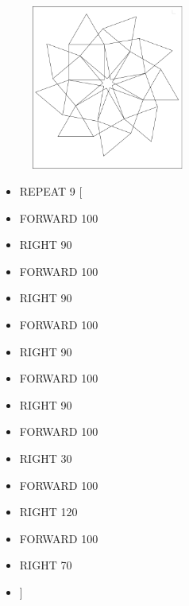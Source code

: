 \begin{minipage}{0.5\textwidth}
\begin{figure}[H]
   \includegraphics[width=5.0cm,trim=4 4 6 4,clip]{./images/marta/mar-14.png}
   \label{mar-16}
\end{figure}
\end{minipage} \hfill
\begin{minipage}{0.45\textwidth}
\begin{itemize}[itemsep=-3pt,parsep=2pt]
\item[] \hspace{0.5cm} REPEAT 9 [
\item[] \hspace{0.5cm} 	FORWARD 100
\item[] \hspace{0.5cm} 	RIGHT 90
\item[] \hspace{0.5cm} 	FORWARD 100
\item[] \hspace{0.5cm} 	RIGHT 90
\item[] \hspace{0.5cm} 	FORWARD 100
\item[] \hspace{0.5cm} 	RIGHT 90
\item[] \hspace{0.5cm} 	FORWARD 100
\item[] \hspace{0.5cm} 	RIGHT 90
\item[] \hspace{0.5cm} 	FORWARD 100
\item[] \hspace{0.5cm} 	RIGHT 30
\item[] \hspace{0.5cm} 	FORWARD 100
\item[] \hspace{0.5cm} 	RIGHT 120
\item[] \hspace{0.5cm} 	FORWARD 100
\item[] \hspace{0.5cm} 	RIGHT 70
\item[] \hspace{0.5cm} 	]          
\end{itemize}          	          
\end{minipage}

